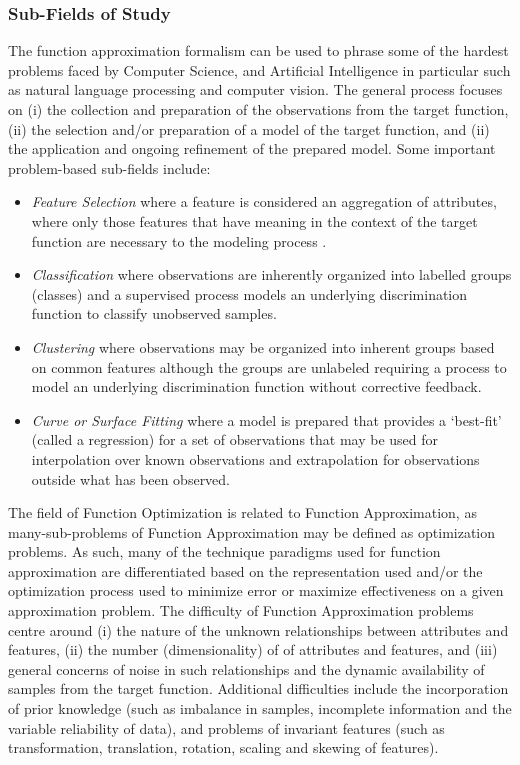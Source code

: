 \documentclass[a4paper, 11pt]{article}
\begin{document}
\subsubsection{Sub-Fields of Study}
The function approximation formalism can be used to phrase some of the hardest problems faced by Computer Science, and Artificial Intelligence in particular such as natural language processing and computer vision. 
The general process focuses on (i) the collection and preparation of the observations from the target function, (ii) the selection and/or preparation of a model of the target function, and (ii) the application and ongoing refinement of the prepared model. 
Some important problem-based sub-fields include: 
\begin{itemize}
	\item \emph{Feature Selection} where a feature is considered an aggregation of attributes, where only those features that have meaning in the context of the target function are necessary to the modeling process \cite{Kudo2000, Guyon2003}.
	\item \emph{Classification} where observations are inherently organized into labelled groups (classes) and a supervised process models an underlying discrimination function to classify unobserved samples.
	\item \emph{Clustering} where observations may be organized into inherent groups based on common features although the groups are unlabeled requiring a process to model an underlying discrimination function without corrective feedback.
	\item \emph{Curve or Surface Fitting} where a model is prepared that provides a `best-fit' (called a regression) for a set of observations that may be used for interpolation over known observations and extrapolation for observations outside what has been observed.
\end{itemize}

The field of Function Optimization is related to Function Approximation, as many-sub-problems of Function Approximation may be defined as optimization problems. As such, many of the technique paradigms used for function approximation are differentiated based on the representation used and/or the optimization process used to minimize error or maximize effectiveness on a given approximation problem. 
The difficulty of Function Approximation problems centre around (i) the nature of the unknown relationships between attributes and features, (ii) the number (dimensionality) of of attributes and features, and (iii) general concerns of noise in such relationships and the dynamic availability of samples from the target function.
Additional difficulties include the incorporation of prior knowledge (such as imbalance in samples, incomplete information and the variable reliability of data), and problems of invariant features (such as transformation, translation, rotation, scaling and skewing of features).
\end{document}
